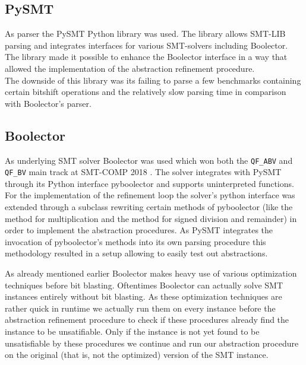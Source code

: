 \subsection{PySMT}
\label{sec:implementation:pysmt}
As parser the PySMT Python library \cite{pysmt2015} was used. The library allows
SMT-LIB parsing and integrates interfaces for various SMT-solvers including Boolector.
The library made it possible to enhance the Boolector interface in a way that allowed the implementation
of the abstraction refinement procedure.\\
The downside of this library was its failing to parse a few benchmarks containing certain bitshift operations
and the relatively slow parsing time in comparison with Boolector's parser\footnotemark.

\subsection{Boolector}
\label{sec:implementation:boolector}
As underlying SMT solver Boolector \cite{Brummayer-Biere2009_Chapter_BoolectorAnEfficientSMTSolverF} was used
which won both the \texttt{QF\_ABV} and \texttt{QF\_BV} main track at SMT-COMP 2018 \cite{SMTCOMP18}.
The solver integrates with PySMT through its Python interface pyboolector and supports uninterpreted functions.
For the implementation of the refinement loop the solver's python interface was extended through a subclass rewriting certain methods of pyboolector
(like the method for multiplication and the method for signed division and remainder) in order to implement the abstraction procedures.
As PySMT integrates the invocation of pyboolector's methods into its own parsing procedure this methodology resulted in a setup allowing to
easily test out abstractions.
\par
As already mentioned earlier Boolector makes heavy use of various optimization techniques before bit blasting.
Oftentimes Boolector can actually solve SMT instances entirely without bit blasting.
As these optimization techniques are rather quick in runtime we actually run them on every instance before the abstraction refinement procedure to check if these
procedures already find the instance to be unsatifiable.
Only if the instance is not yet found to be unsatisfiable by these procedures we continue and run our abstraction procedure on the original (that is, not the optimized) version of the SMT instance.

